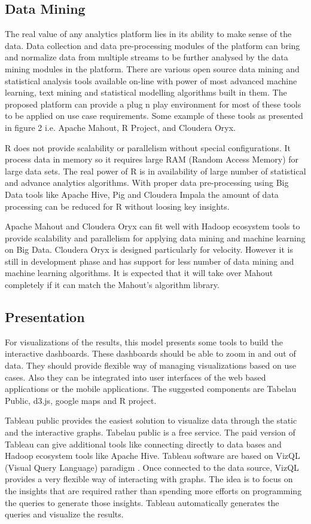 \subsection{Data Mining}
The real value of any analytics platform lies in its ability to make sense of the data. Data collection and data pre-processing modules of the platform can bring and normalize data from multiple streams to be further analysed by the data mining modules in the platform. There are various open source data mining and statistical analysis tools available on-line with power of most advanced machine learning, text mining and statistical modelling algorithms built in them.  The proposed platform can provide a plug n play environment for most of these tools to be applied on use case requirements. Some example of these tools as presented in figure 2 i.e. Apache Mahout, R Project, and Cloudera Oryx. 

R does not provide scalability or parallelism without special configurations. It process data in memory so it requires large RAM (Random Access Memory) for large data sets. The real power of R is in availability of large number of statistical and advance analytics algorithms. With proper data pre-processing using Big Data tools like Apache Hive, Pig and Cloudera Impala the amount of data processing can be reduced for R without loosing key insights.

 Apache Mahout and Cloudera Oryx can fit well with Hadoop ecosystem tools to provide scalability and parallelism for applying data mining and machine learning on Big Data. Cloudera Oryx is designed particularly for velocity. However it is still in development phase and has support for less number of data mining and machine learning algorithms. It is expected that it will take over Mahout completely if it can match the Mahout's algorithm library.  
\subsection{Presentation}  
For visualizations of the results, this model presents some tools to build the interactive dashboards. These dashboards should be able to zoom in and out of data. They should provide flexible way of managing visualizations based on use cases. Also they can be integrated into user interfaces of the web based applications or the mobile applications. The suggested components are Tabelau Public, d3.js, google maps and R project.

Tableau public provides the easiest solution to visualize data through the static and the interactive graphs. Tabelau public is a free service. The paid version of Tableau can give additional tools like connecting directly to data bases and Hadoop ecosystem tools like Apache Hive. Tableau software are based on VizQL (Visual Query Language) paradigm \cite{hanrahan2006vizql}. Once connected to the data source, VizQL  provides a very flexible way of interacting with graphs. The idea is to focus on the insights that are required rather than spending more efforts on programming the queries to generate those insights. Tableau automatically generates the queries and visualize the results.

